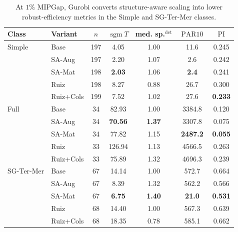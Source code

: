 \documentclass[AMA,Times1COL]{WileyNJDv5} %
\newcommand{\methodBase}{Base}
\newcommand{\methodAug}{SA-Aug}
\newcommand{\methodMat}{SA-Mat}
\newcommand{\methodRuiz}{Ruiz}
\newcommand{\methodRuizCols}{Ruiz+Cols}
\newcommand{\sgm}{\ensuremath{\operatorname{sgm}}}
\newcommand{\PARten}{\ensuremath{\operatorname{PAR10}}}
\newcommand{\PI}{\ensuremath{\operatorname{PI}}}
\providecommand{\DIFaddbegin}{} %
\providecommand{\DIFdelend}{} %
\begin{document}
\DIFdelend \DIFaddbegin \begin{table}[t]
\centering
\footnotesize
\caption{At $1\%$ MIPGap, Gurobi converts structure-aware scaling into lower robust-efficiency metrics in the Simple and SG-Ter-Mer classes.}
\label{tab:robust-gurobi-1pct-mipgap}
\begin{tabular}{@{}ll S[table-format=3.0] S[table-format=3.2] S[table-format=1.2] S[table-format=4.1] S[table-format=1.3] @{}}
\toprule
Class & Variant & {$n$} & {$\sgm T$} & {med. sp.$^{\det}$} & {\PARten{}} & {\PI{}} \\
\midrule
Simple & \methodBase & 197 & 4.05 & 1.00 & 11.6 & 0.245 \\
 & \methodAug & 197 & 2.20 & 1.07 & 2.6 & 0.242 \\
 & \methodMat & 198 & \textbf{2.03} & 1.06 & \textbf{2.4} & 0.241 \\
 & \methodRuiz & 198 & 8.27 & 0.88 & 26.7 & 0.300 \\
 & \methodRuizCols & 199 & 7.52 & 1.02 & 27.6 & \textbf{0.233} \\
\addlinespace
Full & \methodBase & 34 & 82.93 & 1.00 & 3384.8 & 0.120 \\
 & \methodAug & 34 & \textbf{70.56} & \textbf{1.37} & 3307.8 & 0.075 \\
 & \methodMat & 34 & 77.82 & 1.15 & \textbf{2487.2} & \textbf{0.055} \\
 & \methodRuiz & 33 & 126.94 & 1.13 & 4566.5 & 0.263 \\
 & \methodRuizCols & 33 & 75.89 & 1.32 & 4696.3 & 0.239 \\
\addlinespace
SG-Ter-Mer & \methodBase & 67 & 14.14 & 1.00 & 572.7 & 0.664 \\
 & \methodAug & 67 & 8.39 & 1.32 & 562.2 & 0.566 \\
 & \methodMat & 67 & \textbf{6.75} & \textbf{1.40} & \textbf{21.0} & \textbf{0.531} \\
 & \methodRuiz & 68 & 14.40 & 1.00 & 567.3 & 0.639 \\
 & \methodRuizCols & 68 & 18.35 & 0.78 & 585.1 & 0.662 \\

\end{tabular}
\end{table}
\end{document}
